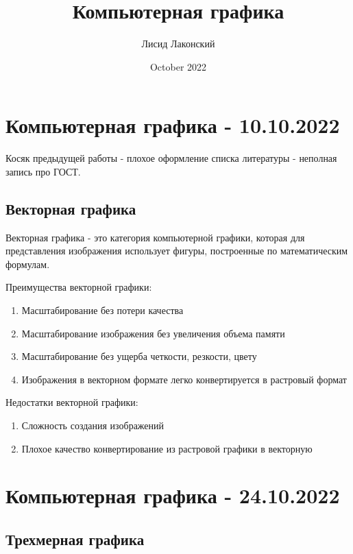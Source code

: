 \documentclass{article}
\title{Компьютерная графика}
\author{Лисид Лаконский}
\date{October 2022}
\begin{document}
\maketitle
\tableofcontents
\pagebreak

\section{Компьютерная графика - 10.10.2022}

Косяк предыдущей работы - плохое оформление списка литературы - неполная запись про ГОСТ.

\subsection{Векторная графика}

\begin{flushleft}

Векторная графика - это категория компьютерной графики, которая для представления изображения использует фигуры, построенные по математическим формулам.

Преимущества векторной графики:

\begin{enumerate}
    \item Масштабирование без потери качества
    \item Масштабирование изображения без увеличения объема памяти
    \item Масштабирование без ущерба четкости, резкости, цвету
    \item Изображения в векторном формате легко конвертируется в растровый формат
\end{enumerate}

Недостатки векторной графики:

\begin{enumerate}
    \item Сложность создания изображений
    \item Плохое качество конвертирование из растровой графики в векторную
\end{enumerate}

\end{flushleft}

\pagebreak
\section{Компьютерная графика - 24.10.2022}

\subsection{Трехмерная графика}
\end{document}
